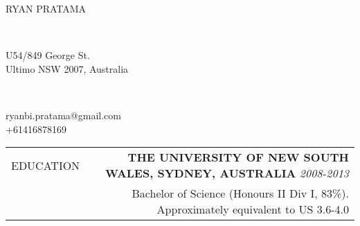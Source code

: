 \documentclass[a4paper,10pt]{article}
\newcommand\VRule{\color{lightgray}\vrule}
\newcommand\HRule{}
\begin{document}

\noindent\makebox[\linewidth]{\rule{\paperwidth}{0.15in}}
\vspace{0.10in}

%

\begin{minipage}[c]{0.4\textwidth}
\Huge \cabincondensed \uppercase{Ryan Pratama}
\end{minipage}
\begin{minipage}[c]{0.025\textwidth}
\\
\end{minipage}
\begin{minipage}[c]{0.275\textwidth}
 U54/849 George St.\\
Ultimo NSW 2007, Australia
\end{minipage}
\begin{minipage}[c]{0.03\textwidth}
\\
\phone
\end{minipage}
\begin{minipage}[c]{0.27\textwidth}
 ryanbi.pratama@gmail.com\\
 +61416878169
\end{minipage}


\vspace{0.25in}


\begin{tabular}{L!{\VRule}R}
\uppercase{Education} \HRule & \textbf{\uppercase{The University of New South Wales, Sydney, Australia}} \hfill\small \textit{2008-2013}\\
 & {Bachelor of Science (Honours II Div I, 83\%). \footnotesize{Approximately equivalent to US 3.6-4.0 \footnotemark[1]}}
\\
\end{tabular}
\end{document}
